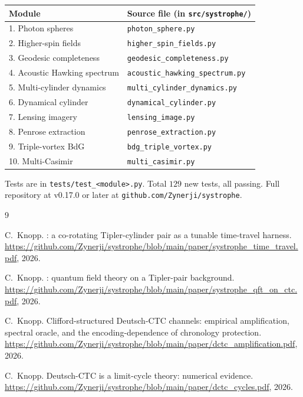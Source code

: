 \documentclass[11pt,a4paper]{article}
\begin{document}
\begin{center}
\begin{tabular}{ll}
\toprule
Module & Source file (in \texttt{src/systrophe/}) \\
\midrule
1. Photon spheres & \texttt{photon\_sphere.py} \\
2. Higher-spin fields & \texttt{higher\_spin\_fields.py} \\
3. Geodesic completeness & \texttt{geodesic\_completeness.py} \\
4. Acoustic Hawking spectrum & \texttt{acoustic\_hawking\_spectrum.py} \\
5. Multi-cylinder dynamics & \texttt{multi\_cylinder\_dynamics.py} \\
6. Dynamical cylinder & \texttt{dynamical\_cylinder.py} \\
7. Lensing imagery & \texttt{lensing\_image.py} \\
8. Penrose extraction & \texttt{penrose\_extraction.py} \\
9. Triple-vortex BdG & \texttt{bdg\_triple\_vortex.py} \\
10. Multi-Casimir & \texttt{multi\_casimir.py} \\
\bottomrule
\end{tabular}
\end{center}

Tests are in \texttt{tests/test\_<module>.py}. Total $129$ new
tests, all passing. Full repository at v0.17.0 or later at
\texttt{github.com/Zynerji/systrophe}.


\begin{thebibliography}{9}

C.~Knopp.
: a co-rotating Tipler-cylinder pair as a tunable
time-travel harness.
\newblock \url{https://github.com/Zynerji/systrophe/blob/main/paper/systrophe_time_travel.pdf}, 2026.

C.~Knopp.
: quantum field theory on a Tipler-pair background.
\newblock \url{https://github.com/Zynerji/systrophe/blob/main/paper/systrophe_qft_on_ctc.pdf}, 2026.

C.~Knopp.
\newblock Clifford-structured Deutsch-CTC channels: empirical
amplification, spectral oracle, and the encoding-dependence of
chronology protection.
\newblock \url{https://github.com/Zynerji/systrophe/blob/main/paper/dctc_amplification.pdf}, 2026.

C.~Knopp.
\newblock Deutsch-CTC is a limit-cycle theory: numerical evidence.
\newblock \url{https://github.com/Zynerji/systrophe/blob/main/paper/dctc_cycles.pdf}, 2026.

\end{thebibliography}
\end{document}
